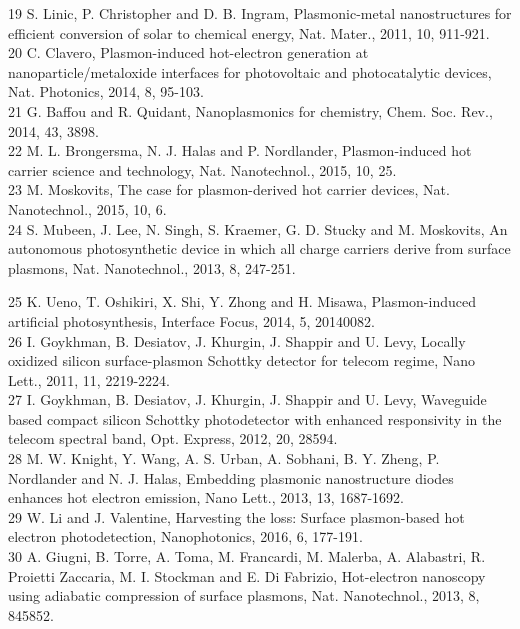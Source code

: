 \documentclass[10pt]{article}
\begin{document}
19 S. Linic, P. Christopher and D. B. Ingram, Plasmonic-metal nanostructures for efficient conversion of solar to chemical energy, Nat. Mater., 2011, 10, 911-921.\\
20 C. Clavero, Plasmon-induced hot-electron generation at nanoparticle/metaloxide interfaces for photovoltaic and photocatalytic devices, Nat. Photonics, 2014, 8, 95-103.\\
21 G. Baffou and R. Quidant, Nanoplasmonics for chemistry, Chem. Soc. Rev., 2014, 43, 3898.\\
22 M. L. Brongersma, N. J. Halas and P. Nordlander, Plasmon-induced hot carrier science and technology, Nat. Nanotechnol., 2015, 10, 25.\\
23 M. Moskovits, The case for plasmon-derived hot carrier devices, Nat. Nanotechnol., 2015, 10, 6.\\
24 S. Mubeen, J. Lee, N. Singh, S. Kraemer, G. D. Stucky and M. Moskovits, An autonomous photosynthetic device in which all charge carriers derive from surface plasmons, Nat. Nanotechnol., 2013, 8, 247-251.

25 K. Ueno, T. Oshikiri, X. Shi, Y. Zhong and H. Misawa, Plasmon-induced artificial photosynthesis, Interface Focus, 2014, 5, 20140082.\\
26 I. Goykhman, B. Desiatov, J. Khurgin, J. Shappir and U. Levy, Locally oxidized silicon surface-plasmon Schottky detector for telecom regime, Nano Lett., 2011, 11, 2219-2224.\\
27 I. Goykhman, B. Desiatov, J. Khurgin, J. Shappir and U. Levy, Waveguide based compact silicon Schottky photodetector with enhanced responsivity in the telecom spectral band, Opt. Express, 2012, 20, 28594.\\
28 M. W. Knight, Y. Wang, A. S. Urban, A. Sobhani, B. Y. Zheng, P. Nordlander and N. J. Halas, Embedding plasmonic nanostructure diodes enhances hot electron emission, Nano Lett., 2013, 13, 1687-1692.\\
29 W. Li and J. Valentine, Harvesting the loss: Surface plasmon-based hot electron photodetection, Nanophotonics, 2016, 6, 177-191.\\
30 A. Giugni, B. Torre, A. Toma, M. Francardi, M. Malerba, A. Alabastri, R. Proietti Zaccaria, M. I. Stockman and E. Di Fabrizio, Hot-electron nanoscopy using adiabatic compression of surface plasmons, Nat. Nanotechnol., 2013, 8, 845852.
\end{document}
